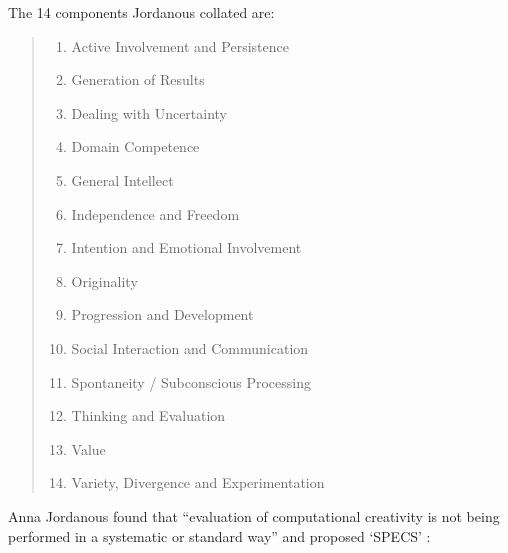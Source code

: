 The \num{14} components Jordanous collated are: \citeyear[p.118-120]{Jordanous2012}
\begin{quotation}
  \begin{enumerate}
    \item Active Involvement and Persistence
    \item Generation of Results
    \item Dealing with Uncertainty
    \item Domain Competence
    \item General Intellect
    \item Independence and Freedom
    \item Intention and Emotional Involvement
    \item Originality
    \item Progression and Development
    \item Social Interaction and Communication
    \item Spontaneity / Subconscious Processing
    \item Thinking and Evaluation
    \item Value
    \item Variety, Divergence and Experimentation
  \end{enumerate}
\end{quotation}

Anna Jordanous found that ``evaluation of computational creativity is not being performed in a systematic or standard way'' \citeyear[p.2]{Jordanous2011} and proposed `\ac{SPECS}' \citeyear[p.137-140]{Jordanous2012a}:

